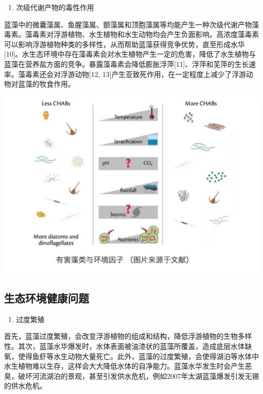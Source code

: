\documentclass[]{book}
\providecommand{\tightlist}{%
  \setlength{\itemsep}{0pt}\setlength{\parskip}{0pt}}
\begin{document}
\begin{enumerate}
\def\labelenumi{\arabic{enumi}.}
\setcounter{enumi}{4}
\tightlist
\item
  次级代谢产物的毒性作用
\end{enumerate}

蓝藻中的微囊藻属、鱼腥藻属、颤藻属和顶胞藻属等均能产生一种次级代谢产物藻毒素。藻毒素对浮游植物、水生植物和水生动物均会产生负面影响。高浓度藻毒素可以影响浮游植物种类的多样性，从而帮助蓝藻获得竞争优势，直至形成水华{[}10{]}。水生态环境中存在藻毒素会对水生植物产生一定的危害，降低了水生植物与蓝藻在营养盐方面的竞争。暴露藻毒素会降低膨胀浮萍{[}11{]}、浮萍和芜萍的生长速率。藻毒素还会对浮游动物{[}12,
13{]}产生亚致死作用，在一定程度上减少了浮游动物对蓝藻的牧食作用。

\includegraphics[width=8.33in]{images/lanzao2}

\subsection{生态环境健康问题}

\begin{enumerate}
\def\labelenumi{\arabic{enumi}.}
\tightlist
\item
  过度繁殖
\end{enumerate}

首先，蓝藻过度繁殖，会改变浮游植物的组成和结构，降低浮游植物的生物多样性。其次，蓝藻水华爆发时，水体表面被油漆状的蓝藻所覆盖，造成底层水体缺氧，使得鱼虾等水生动物大量死亡。此外，蓝藻的过度繁殖，会使得湖泊等水体中水生植物难以生存，这样会大大降低水体的自净能力。蓝藻水华发生时会产生恶臭，破坏河流湖泊的景观，甚至引发供水危机，例如2007年太湖蓝藻爆发引发无锡的供水危机。
\end{document}
